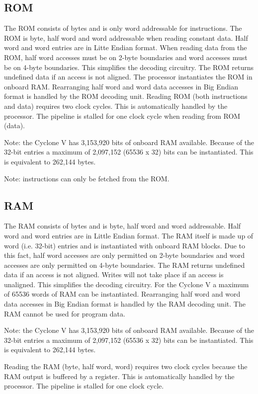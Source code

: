 \documentclass[12pt]{article}
\begin{document}
\subsection{ROM}
\label{sec:rom}
The ROM consists of bytes and is only word addressable for instructions. The ROM is byte, half word and word addressable when reading constant data. Half word and word entries are in Litte Endian format. When reading data from the ROM, half word accesses must be on 2-byte boundaries and word accesses must be on 4-byte boundaries. This simplifies the decoding circuitry. The ROM returns undefined data if an access is not aligned. The processor instantiates the ROM in onboard RAM. Rearranging half word and word data accesses in Big Endian format is handled by the ROM decoding unit. Reading ROM (both instructions and data) requires two clock cycles.  This is automatically handled by the processor. The pipeline is stalled for one clock cycle when reading from ROM (data).

Note: the Cyclone V has 3,153,920 bits of onboard RAM available. Because of the 32-bit entries a maximum of 2,097,152 (65536 x 32) bits can be instantiated. This is equivalent to 262,144 bytes.

Note: instructions can only be fetched from the ROM.

\subsection{RAM}
\label{sec:ram}
The RAM consists of bytes and is byte, half word and word addressable. Half word and word entries are in Little Endian format. The RAM itself is made up of word (i.e. 32-bit) entries and is instantiated with onboard RAM blocks. Due to this fact, half word accesses are only permitted on 2-byte boundaries and word accesses are only permitted on 4-byte boundaries. The RAM returns undefined data if an access is not aligned. Writes will not take place if an access is unaligned. This simplifies the decoding circuitry. For the Cyclone V a maximum of 65536 words of RAM can be instantiated. Rearranging half word and word data accesses in Big Endian format is handled by the RAM decoding unit. The RAM cannot be used for program data.

Note: the Cyclone V has 3,153,920 bits of onboard RAM available. Because of the 32-bit entries a maximum of 2,097,152 (65536 x 32) bits can be instantiated. This is equivalent to 262,144 bytes.

Reading the RAM (byte, half word, word) requires two clock cycles because the RAM output is buffered by a register. This is automatically handled by the processor. The pipeline is stalled for one clock cycle.
\end{document}
